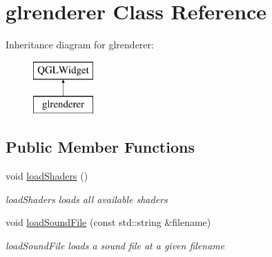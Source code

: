 \hypertarget{classglrenderer}{\section{glrenderer Class Reference}
\label{classglrenderer}
}
Inheritance diagram for glrenderer\+:\begin{figure}[H]
\begin{center}
\leavevmode
\includegraphics[height=2.000000cm]{classglrenderer}
\end{center}
\end{figure}
\subsection*{Public Member Functions}
\begin{DoxyCompactItemize}
\item 
\hypertarget{classglrenderer_acb574b369f4dd78d048ef4703c017c1a}{void \hyperlink{classglrenderer_acb574b369f4dd78d048ef4703c017c1a}{load\+Shaders} ()}\label{classglrenderer_acb574b369f4dd78d048ef4703c017c1a}

\begin{DoxyCompactList}\small\item\em load\+Shaders loads all available shaders \end{DoxyCompactList}\item 
void \hyperlink{classglrenderer_aef045836076110d931a2a372a7cfb3ff}{load\+Sound\+File} (const std\+::string \&filename)
\begin{DoxyCompactList}\small\item\em load\+Sound\+File loads a sound file at a given filename \end{DoxyCompactList}\end{DoxyCompactItemize}
